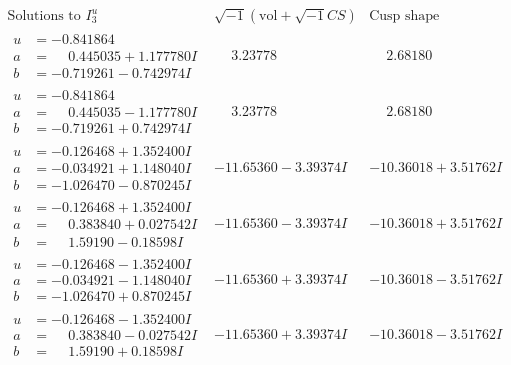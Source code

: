 \documentclass[1p]{elsarticle_modified}
\theoremstyle{definition}
\newcommand{\I}{\sqrt{-1}}
\begin{document}
$$\begin{array}{c|c|c}  
\text{Solutions to }I^u_{3}& \I (\text{vol} + \sqrt{-1}CS) & \text{Cusp shape}\\
 \hline 
\begin{aligned}
u &= -0.841864\phantom{ +0.000000I} \\
a &= \phantom{-}0.445035 + 1.177780 I \\
b &= -0.719261 - 0.742974 I\end{aligned}
 & \phantom{-}3.23778\phantom{ +0.000000I} & \phantom{-}2.68180\phantom{ +0.000000I} \\ \hline\begin{aligned}
u &= -0.841864\phantom{ +0.000000I} \\
a &= \phantom{-}0.445035 - 1.177780 I \\
b &= -0.719261 + 0.742974 I\end{aligned}
 & \phantom{-}3.23778\phantom{ +0.000000I} & \phantom{-}2.68180\phantom{ +0.000000I} \\ \hline\begin{aligned}
u &= -0.126468 + 1.352400 I \\
a &= -0.034921 + 1.148040 I \\
b &= -1.026470 - 0.870245 I\end{aligned}
 & -11.65360 - 3.39374 I & -10.36018 + 3.51762 I \\ \hline\begin{aligned}
u &= -0.126468 + 1.352400 I \\
a &= \phantom{-}0.383840 + 0.027542 I \\
b &= \phantom{-}1.59190 - 0.18598 I\end{aligned}
 & -11.65360 - 3.39374 I & -10.36018 + 3.51762 I \\ \hline\begin{aligned}
u &= -0.126468 - 1.352400 I \\
a &= -0.034921 - 1.148040 I \\
b &= -1.026470 + 0.870245 I\end{aligned}
 & -11.65360 + 3.39374 I & -10.36018 - 3.51762 I \\ \hline\begin{aligned}
u &= -0.126468 - 1.352400 I \\
a &= \phantom{-}0.383840 - 0.027542 I \\
b &= \phantom{-}1.59190 + 0.18598 I\end{aligned}
 & -11.65360 + 3.39374 I & -10.36018 - 3.51762 I \\ \hline\begin{aligned}

\end{aligned}
\end{array}$$
\end{document}
